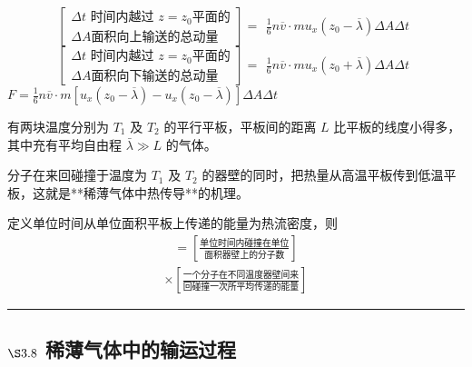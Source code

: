 \documentclass{ctexart}
\begin{document}
\begin{equation*}
   \left[
    \begin{array}{l}
    \text{$\Delta t $ 时间内越过 $z=z_0 $平面的} \\ [0.1pt]
    \text{$\Delta A$面积向上输送的总动量}
    \end{array}
   \right]
  =
   \begin{array}{l}
      \frac{1}{6} n\overline{v}\cdot mu_x(z_0-\overline{\lambda })\Delta A\Delta t 
   \end{array}
  \end{equation*}
   \begin{equation*}
   \left[
    \begin{array}{l}
    \text{$\Delta t $ 时间内越过 $z=z_0 $平面的} \\ [0.1pt]
    \text{$\Delta A$面积向下输送的总动量}
    \end{array}
   \right]
  =
   \begin{array}{l}
      \frac{1}{6} n\overline{v}\cdot mu_x(z_0+\overline{\lambda })\Delta A\Delta t 
   \end{array}
  \end{equation*}
  $F= \frac{1}{6} n\overline{v}\cdot m[u_x(z_0-\overline{\lambda })-u_x(z_0-\overline{\lambda })]\Delta A\Delta t $



有两块温度分别为 $T_1$ 及 $T_2$ 的平行平板，平板间的距离 $L$ 比平板的线度小得多，其中充有平均自由程 $\bar{\lambda} \gg L$ 的气体。

分子在来回碰撞于温度为 $T_1$ 及 $T_2$ 的器壁的同时，把热量从高温平板传到低温平板，这就是**稀薄气体中热传导**的机理。

定义单位时间从单位面积平板上传递的能量为热流密度，则
\begin{align*}
[\text{热流密度}] = \left[\frac{\text{单位时间内碰撞在单位}}{\text{面积器壁上的分子数}}\right]
\end{align*}
\begin{align*}
\times \left[\frac{\text{一个分子在不同温度器壁间来}}{\text{回碰撞一次所平均传递的能量}}\right]
\end{align*}

\hrule
\vspace{1em} %

\subsection*{$\S 3.8$ 稀薄气体中的输运过程}
\end{document}

